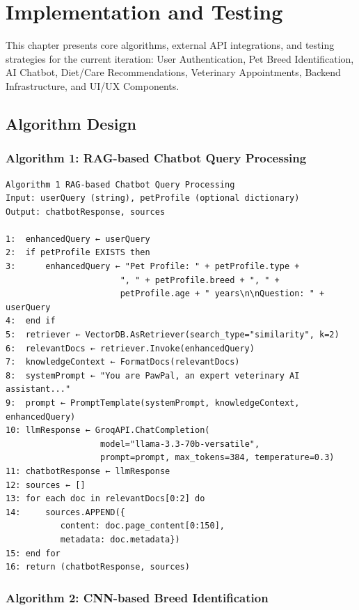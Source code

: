 \chapter{Implementation and Testing}

This chapter presents core algorithms, external API integrations, and testing strategies for the current iteration: User Authentication, Pet Breed Identification, AI Chatbot, Diet/Care Recommendations, Veterinary Appointments, Backend Infrastructure, and UI/UX Components.

\section{Algorithm Design}

\subsection{Algorithm 1: RAG-based Chatbot Query Processing}

\begin{verbatim}
Algorithm 1 RAG-based Chatbot Query Processing
Input: userQuery (string), petProfile (optional dictionary)
Output: chatbotResponse, sources

1:  enhancedQuery ← userQuery
2:  if petProfile EXISTS then
3:      enhancedQuery ← "Pet Profile: " + petProfile.type + 
                       ", " + petProfile.breed + ", " + 
                       petProfile.age + " years\n\nQuestion: " + userQuery
4:  end if
5:  retriever ← VectorDB.AsRetriever(search_type="similarity", k=2)
6:  relevantDocs ← retriever.Invoke(enhancedQuery)
7:  knowledgeContext ← FormatDocs(relevantDocs)
8:  systemPrompt ← "You are PawPal, an expert veterinary AI assistant..."
9:  prompt ← PromptTemplate(systemPrompt, knowledgeContext, enhancedQuery)
10: llmResponse ← GroqAPI.ChatCompletion(
                   model="llama-3.3-70b-versatile",
                   prompt=prompt, max_tokens=384, temperature=0.3)
11: chatbotResponse ← llmResponse
12: sources ← []
13: for each doc in relevantDocs[0:2] do
14:     sources.APPEND({
           content: doc.page_content[0:150],
           metadata: doc.metadata})
15: end for
16: return (chatbotResponse, sources)
\end{verbatim}

\subsection{Algorithm 2: CNN-based Breed Identification}

